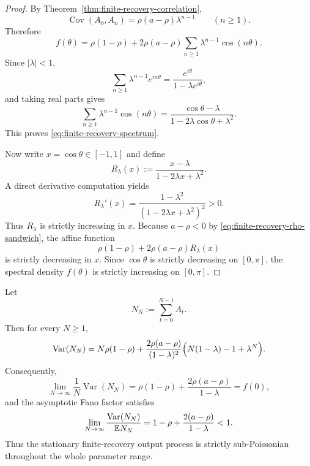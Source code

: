 \begin{proof}
By Theorem~\ref{thm:finite-recovery-correlation},
\[
\operatorname{Cov}(A_0,A_n)=\rho(a-\rho)\lambda^{n-1}
\qquad(n\ge 1).
\]
Therefore
\[
f(\theta)
=
\rho(1-\rho)
+
2\rho(a-\rho)\sum_{n\ge 1}\lambda^{n-1}\cos(n\theta).
\]
Since $|\lambda|<1$,
\[
\sum_{n\ge 1}\lambda^{n-1}e^{in\theta}
=
\frac{e^{i\theta}}{1-\lambda e^{i\theta}},
\]
and taking real parts gives
\[
\sum_{n\ge 1}\lambda^{n-1}\cos(n\theta)
=
\frac{\cos\theta-\lambda}{1-2\lambda\cos\theta+\lambda^2}.
\]
This proves \eqref{eq:finite-recovery-spectrum}.

Now write $x=\cos\theta\in[-1,1]$ and define
\[
R_\lambda(x):=\frac{x-\lambda}{1-2\lambda x+\lambda^2}.
\]
A direct derivative computation yields
\[
R_\lambda'(x)=\frac{1-\lambda^2}{(1-2\lambda x+\lambda^2)^2}>0.
\]
Thus $R_\lambda$ is strictly increasing in $x$. Because $a-\rho<0$ by \eqref{eq:finite-recovery-rho-sandwich}, the affine function
\[
\rho(1-\rho)+2\rho(a-\rho)R_\lambda(x)
\]
is strictly decreasing in $x$. Since $\cos\theta$ is strictly decreasing on $[0,\pi]$, the spectral density $f(\theta)$ is strictly increasing on $[0,\pi]$.
\end{proof}

\begin{corollary}\label{cor:finite-recovery-counting}
Let
\[
N_N:=\sum_{t=0}^{N-1}A_t.
\]
Then for every $N\ge 1$,
\begin{equation}\label{eq:finite-recovery-count-variance}
\operatorname{Var}(N_N)
=
N\rho(1-\rho)
+
\frac{2\rho(a-\rho)}{(1-\lambda)^2}
\Bigl(N(1-\lambda)-1+\lambda^N\Bigr).
\end{equation}
Consequently,
\begin{equation}\label{eq:finite-recovery-count-variance-density}
\lim_{N\to\infty}\frac{1}{N}\operatorname{Var}(N_N)
=
\rho(1-\rho)+\frac{2\rho(a-\rho)}{1-\lambda}
=
f(0),
\end{equation}
and the asymptotic Fano factor satisfies
\begin{equation}\label{eq:finite-recovery-fano}
\lim_{N\to\infty}\frac{\operatorname{Var}(N_N)}{\mathbb{E} N_N}
=
1-\rho+\frac{2(a-\rho)}{1-\lambda}
<1.
\end{equation}
Thus the stationary finite-recovery output process is strictly sub-Poissonian throughout the whole parameter range.
\end{corollary}

